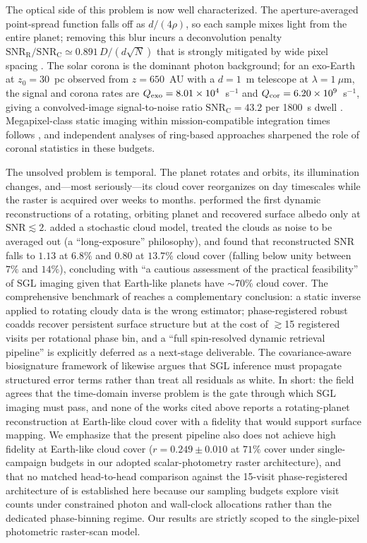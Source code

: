 \documentclass[twocolumn,10pt]{article}
\begin{document}
The optical side of this problem is now well characterized. The
aperture-averaged point-spread function falls off as $d/(4\rho)$, so each
sample mixes light from the entire planet; removing this blur incurs a
deconvolution penalty $\mathrm{SNR_R/SNR_C}\simeq0.891\,D/(d\sqrt{N})$
that is strongly mitigated by wide pixel spacing \citep{toth21,tt22mnras}.
The solar corona is the dominant photon background; for an exo-Earth at
$z_0=30$~pc observed from $z=650$~AU with a $d=1$~m telescope at
$\lambda=1~\mu$m, the signal and corona rates are
$Q_{\rm exo}=8.01\times10^4$~s$^{-1}$ and
$Q_{\rm cor}=6.20\times10^9$~s$^{-1}$, giving a convolved-image
signal-to-noise ratio $\mathrm{SNR_C}=43.2$ per 1800~s dwell
\citep{tt22mnras,tur26bench}. Megapixel-class static imaging within
mission-compatible integration times follows \citep{toth21,tt22mnras},
and independent analyses of ring-based approaches
\citep{mm22} sharpened the role of coronal statistics in these budgets.

The unsolved problem is temporal. The planet rotates and orbits, its
illumination changes, and---most seriously---its cloud cover reorganizes
on day timescales while the raster is acquired over weeks to months.
\citet{toth23} performed the first dynamic reconstructions of a rotating,
orbiting planet and recovered surface albedo only at
$\mathrm{SNR}\lesssim2$. \citet{toth25clouds} added a stochastic cloud
model, treated the clouds as noise to be averaged out (a
``long-exposure'' philosophy), and found that reconstructed SNR falls to $1.13$ at $6.8\%$ and $0.80$ at $13.7\%$ cloud cover (falling below unity between $7\%$ and $14\%$), concluding with ``a cautious
assessment of the practical feasibility'' of SGL imaging given that
Earth-like planets have $\sim$70\% cloud cover. The comprehensive
benchmark of \citet{tur26bench} reaches a complementary conclusion: a
static inverse applied to rotating cloudy data is the wrong estimator;
phase-registered robust coadds recover persistent surface structure but
at the cost of $\gtrsim$15 registered visits per rotational phase bin,
and a ``full spin-resolved dynamic retrieval pipeline'' is explicitly
deferred as a next-stage deliverable. The covariance-aware biosignature
framework of \citet{cov26} likewise argues that SGL inference must
propagate structured error terms rather than treat all residuals as
white. In short: the field agrees that the time-domain inverse problem is
the gate through which SGL imaging must pass, and none of the works cited above
reports a rotating-planet reconstruction at Earth-like cloud cover with a fidelity
that would support surface mapping. We emphasize that the present pipeline also does not achieve high fidelity at Earth-like cloud cover ($r = 0.249 \pm 0.010$ at $71\%$ cover under single-campaign budgets in our adopted scalar-photometry raster architecture), and that no matched head-to-head comparison against the 15-visit phase-registered architecture of \citet{tur26bench} is established here because our sampling budgets explore visit counts under constrained photon and wall-clock allocations rather than the dedicated phase-binning regime. Our results are strictly scoped to the single-pixel photometric raster-scan model.
\end{document}
